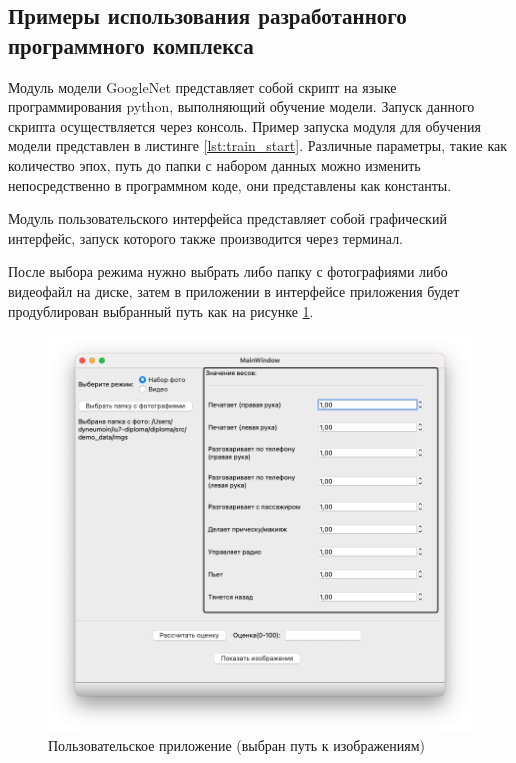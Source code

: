 \subsection{Примеры использования разработанного программного комплекса}
Модуль модели GoogleNet представляет собой скрипт на языке программирования python, выполняющий обучение модели. Запуск данного скрипта осуществляется через консоль. Пример запуска модуля для обучения модели представлен в листинге \ref{lst:train_start}. Различные параметры, такие как количество эпох, путь до папки с набором данных можно изменить непосредственно в программном коде, они представлены как константы.



Модуль пользовательского интерфейса представляет собой графический интерфейс, запуск которого также производится через терминал. 

После выбора режима нужно выбрать либо папку с фотографиями либо видеофайл на диске, затем в приложении в интерфейсе приложения будет продублирован выбранный путь как на рисунке \ref{fig:example_app_1}.

\begin{figure}[hbtp]
	\centering
	\includegraphics[scale=0.55]{img/example_app_1.png}
	\caption{Пользовательское приложение (выбран путь к изображениям)}
	\label{fig:example_app_1}
\end{figure}
\clearpage

